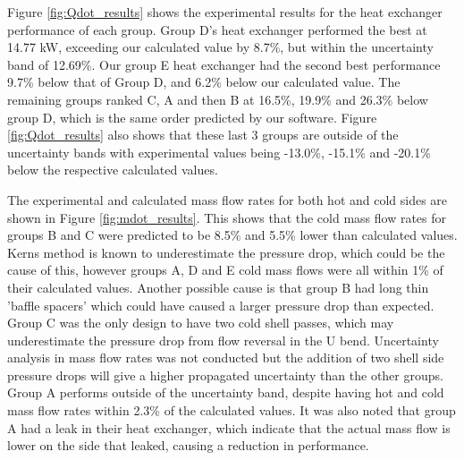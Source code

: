\documentclass{article}
\begin{document}
Figure \ref{fig:Qdot_results} shows the experimental results for the heat exchanger performance of each group.
Group D's heat exchanger performed the best at 14.77 kW, exceeding our calculated value by 8.7\%, but within the uncertainty band of 12.69\%.
Our group E heat exchanger had the second best performance 9.7\% below that of Group D, and 6.2\% below our calculated value.
The remaining groups ranked C, A and then B at 16.5\%, 19.9\% and 26.3\% below group D, which is the same order predicted by our software.
Figure \ref{fig:Qdot_results} also shows that these last 3 groups are outside of the uncertainty bands with experimental values being
-13.0\%, -15.1\% and -20.1\% below the respective calculated values.


The experimental and calculated mass flow rates for both hot and cold sides are shown in Figure \ref{fig:mdot_results}.
This shows that the cold mass flow rates for groups B and C were predicted to be 8.5\% and 5.5\% lower than calculated values.
Kerns method is known to underestimate the pressure drop, which could be the cause of this, however groups A, D and E cold mass flows were all within 1\% of their calculated values.
Another possible cause is that group B had long thin 'baffle spacers' which could have caused a larger pressure drop than expected.
Group C was the only design to have two cold shell passes, which may underestimate the pressure drop from flow reversal in the U bend.
Uncertainty analysis in mass flow rates was not conducted but the addition of two shell side pressure drops will give a higher propagated uncertainty than the other groups.
Group A performs outside of the uncertainty band, despite having hot and cold mass flow rates within 2.3\% of the calculated values.
It was also noted that group A had a leak in their heat exchanger, which indicate that the actual mass flow is lower on the side that leaked,
causing a reduction in performance.


\end{document}
